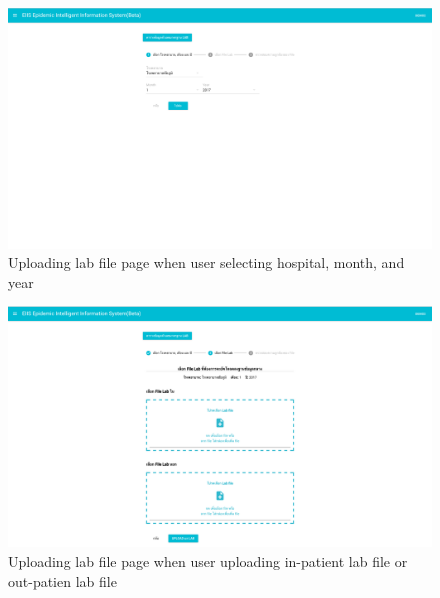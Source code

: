    	\vspace{10mm}
    \FloatBarrier
    	\begin{figure}[h!]
            \centering
        		\includegraphics[width=12cm]{images/chapter-05/upload1.png}
        		\caption{Uploading lab file page when user selecting hospital, month, and year}
        		\label{upload-status1}
        \end{figure}
	\FloatBarrier
	
	\FloatBarrier
    	\begin{figure}[h!]
            \centering
        		\includegraphics[width=12cm]{images/chapter-05/upload2.png}
        		\caption{Uploading lab file page when user uploading in-patient lab file or out-patien lab file}
        		\label{upload-status2}
        \end{figure}
	\FloatBarrier
	
